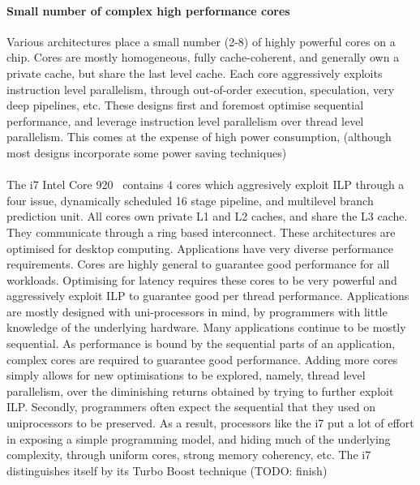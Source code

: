 \paragraph{Small number of complex high performance cores}
Various architectures place a small number (2-8) of highly
powerful cores on a chip.  Cores are mostly homogeneous, fully cache-coherent,
and generally own a private cache, but share the last level cache. 
Each core aggressively exploits instruction level parallelism, through
out-of-order execution, speculation, very deep pipelines, etc. 
These designs first and foremost optimise sequential performance, 
and leverage instruction level parallelism over thread level parallelism. 
This comes at the expense of high power consumption, 
(although most designs incorporate some power
saving techniques)~\cite{Vajda:1414193,Borkar:2007:TCC:1278480.1278667}
\paragraph{} The i7 Intel Core 920~\cite{rotem2012pai} contains 4 cores which aggresively exploit ILP through a four issue, dynamically scheduled 16 stage pipeline, and multilevel branch prediction unit. All cores own
 private L1 and L2 caches, and share the L3 cache. They communicate
through a ring based interconnect. These architectures are
optimised for desktop computing. Applications have very diverse performance requirements. Cores are highly general to guarantee good performance for all workloads. Optimising for latency requires these cores to be very powerful  and aggressively exploit ILP to guarantee good per thread performance. Applications are mostly designed with uni-processors in mind, by programmers with little knowledge of the underlying hardware. Many applications continue to be mostly sequential. As performance is bound by the sequential parts of an application, 
complex cores are required to guarantee good performance. 
Adding more cores simply allows for new optimisations to be explored, namely, 
thread level parallelism, over the diminishing returns obtained by trying
to further exploit ILP.  Secondly, programmers often expect the 
sequential that they used on uniprocessors to be preserved. 
As a result, processors like the i7 put a lot of effort in exposing
a simple programming model, and hiding much of the underlying complexity, through
uniform cores, strong memory coherency, etc. 
The i7 distinguishes itself by its Turbo Boost technique (TODO: finish)



